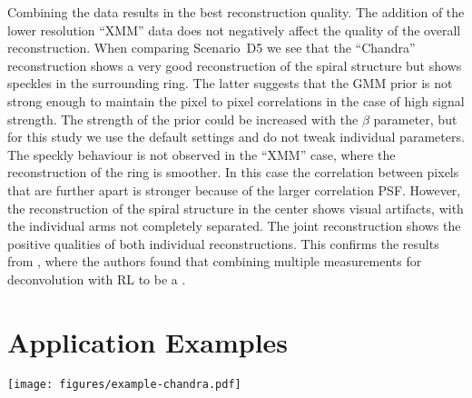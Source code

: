 \documentclass[twocolumn, lineno]{aastex631}
\newcommand{\chandra}{\textit{Chandra}~}
\newcommand{\jolideco}{\textit{Jolideco}~}
\begin{document}
    Combining the data results in the best reconstruction quality. The addition of the lower resolution \enquote{XMM} data does not negatively affect the quality of the overall reconstruction. When comparing Scenario~D5 we see that the \enquote{Chandra} reconstruction shows a very good reconstruction of the spiral structure but shows speckles in the surrounding ring. The latter suggests that the GMM prior is not strong enough to maintain the pixel to pixel correlations in the case of high signal strength. The strength of the prior could be increased with the $\beta$ parameter, but for this study we use the default settings and do not tweak individual parameters. The speckly behaviour is not observed in the \enquote{XMM} case, where the reconstruction of the ring is smoother. In this case the correlation between pixels that are further apart is stronger because of the larger correlation PSF. However, the reconstruction of the spiral structure in the center shows visual artifacts, with the individual arms not completely separated. The joint reconstruction shows the positive qualities of both individual reconstructions. This confirms the results from \cite{Ingaramo2014}, where the authors found that combining multiple measurements for deconvolution with RL to be a .

    \section{Application Examples}
    \begin{figure*}
        \begin{centering}
            \texttt{[image: figures/example-chandra.pdf]}
            \caption{
               \jolideco result with the JWST patch prior for \chandra observations of SNR \textit{1E~0102.2–7219}. The bottom left image shows the summed counts from 25 observations. The bottom right image  shows the the \jolideco deconvolution. The flux is given as a counts rate relative to obsID 1308. The panels \textit{Zoom A}, \textit{Zoom B} and \textit{Zoom C} show a zoomed-in version of three example regions in the SNR, marked with the white rectangles in the large images. The colormap and scale used in the zoom insets is the same as used for the larger images.
            }
            \label{fig:example-chandra}
        \end{centering}
    \end{figure*}
\end{document}
